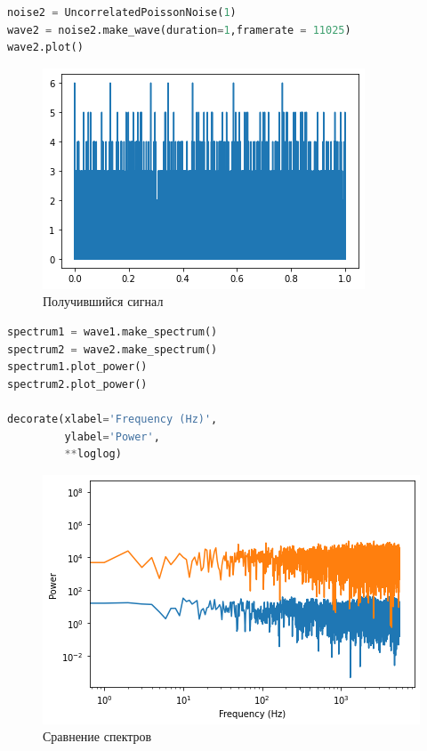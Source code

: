 \begin{lstlisting}[language=Python]
noise2 = UncorrelatedPoissonNoise(1)
wave2 = noise2.make_wave(duration=1,framerate = 11025)
wave2.plot()
\end{lstlisting}
\begin{figure}[H]
	\begin{center}
		\includegraphics[scale=1]{fig/lab04/lab04_39_0.png}
		\caption{Получившийся сигнал}
	\end{center}
\end{figure}
\begin{lstlisting}[language=Python]
spectrum1 = wave1.make_spectrum()
spectrum2 = wave2.make_spectrum()
spectrum1.plot_power()
spectrum2.plot_power()

decorate(xlabel='Frequency (Hz)', 
         ylabel='Power', 
         **loglog)
\end{lstlisting}
\begin{figure}[H]
	\begin{center}
		\includegraphics[scale=1]{fig/lab04/lab04_41_0.png}
		\caption{Сравнение спектров}
	\end{center}
\end{figure}

